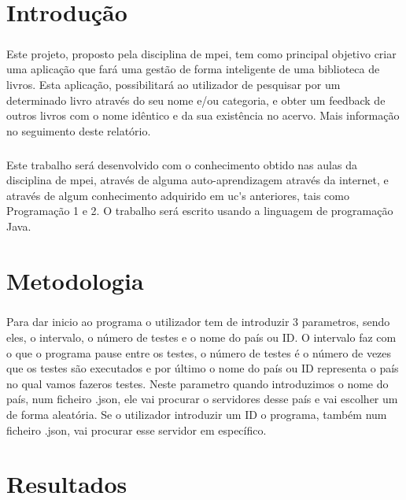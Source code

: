 \documentclass{report}
\begin{document}
\chapter{Introdução}
\label{chap.introducao}
\paragraph{} 
Este projeto, proposto pela disciplina de \acs{mpei}, tem como principal objetivo criar uma aplicação que fará uma gestão de forma inteligente de uma biblioteca de livros. Esta aplicação, possibilitará ao utilizador de pesquisar por um determinado livro através do seu nome e/ou categoria, e obter um feedback de outros livros com o nome idêntico e da sua existência no acervo. Mais informação no seguimento deste relatório.
\paragraph{}
Este trabalho será desenvolvido com o conhecimento obtido nas aulas da disciplina de \acs{mpei}, através de alguma auto-aprendizagem através da internet, e através de algum conhecimento adquirido em \acs{uc's} anteriores, tais como Programação 1 e 2. O trabalho será escrito usando a linguagem de programação Java.

\chapter{Metodologia}
\label{chap.metodologia}
\paragraph{}
Para dar inicio ao programa o utilizador tem de introduzir 3 parametros, sendo eles, o intervalo, o número de testes e o nome do país ou ID. O intervalo faz com o que o programa pause entre os testes, o número de testes é o número de vezes que os testes são executados e por último o nome do país ou ID representa o país no qual vamos fazeros testes. Neste parametro quando introduzimos o nome do país, num ficheiro .json, ele vai procurar o servidores desse país e vai escolher um de forma aleatória. Se o utilizador introduzir um ID o programa, também num ficheiro .json, vai procurar esse servidor em específico.

\chapter{Resultados}
\label{chap.resultados}
\end{document}
